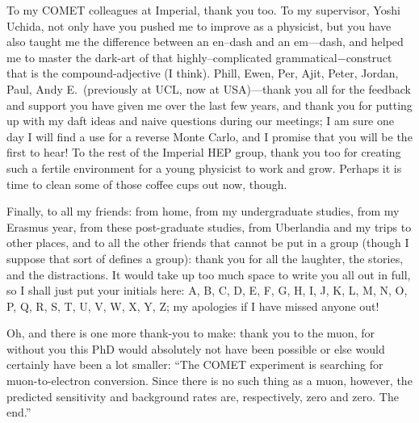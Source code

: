 \begin{acknowledgements}
To my COMET colleagues at Imperial, thank you too.
To my supervisor, Yoshi Uchida, not only have you pushed me to improve as a physicist, but you have also taught me the difference between an en--dash and an em---dash, and helped me to master the dark-art of that highly--complicated grammatical$-$construct that is the compound-adjective (I think).
Phill, Ewen, Per, Ajit, Peter, Jordan, Paul, Andy E.\ (previously at UCL, now at USA)---thank you all for the feedback and support you have given me over the last few years, and thank you 
	for putting up with my daft ideas and naive questions during our meetings; I am sure one day I will find a use for a reverse Monte Carlo, and I promise that you will be the first to hear!
To the rest of the Imperial HEP group, thank you too for creating such a fertile environment for a young physicist to work and grow.
Perhaps it is time to clean some of those coffee cups out now, though.

Finally, to all my friends: from home, from my undergraduate studies, from my Erasmus year, from these post-graduate studies, from Uberlandia and my trips to other places, and to all the other friends that cannot be put in a group (though I suppose that sort of defines a group):
	thank you for all the laughter, the stories, and the distractions.
It would take up too much space to write you all out in full, so I shall just put your initials here:
A, B, C, D, E, F, G, H, I, J, K, L, M, N, O, P, Q, R, S, T, U, V, W, X, Y, Z;
my apologies if I have missed anyone out!

Oh, and there is one more thank-you to make: thank you to the muon, for without you this PhD would absolutely not have been possible or else would certainly have been a lot smaller:
``The COMET experiment is searching for muon-to-electron conversion. Since there is no such thing as a muon, however, the predicted sensitivity and background rates are, respectively, zero and zero.  The end.''

%
%



\end{acknowledgements}
